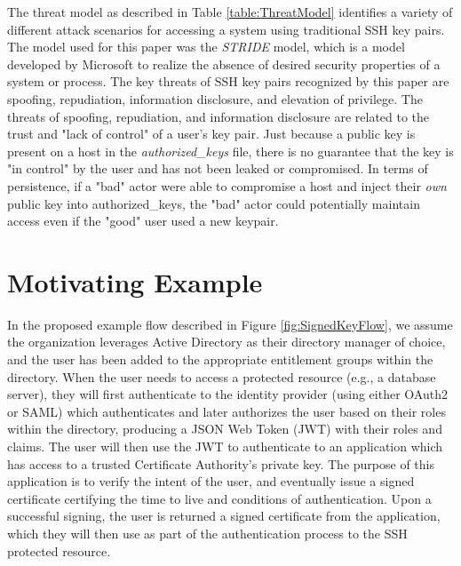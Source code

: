 \documentclass[conference]{IEEEtran}
\begin{document}
The threat model as described in Table \ref{table:ThreatModel} identifies a variety of different attack scenarios for accessing a system using traditional SSH key pairs. The model used for this paper was the \textit{STRIDE} model, which is a model developed by Microsoft to realize the absence of desired security properties of a system or process. The key threats of SSH key pairs recognized by this paper are spoofing, repudiation, information disclosure, and elevation of privilege. The threats of spoofing, repudiation, and information disclosure are related to the trust and "lack of control" of a user's key pair. Just because a public key is present on a host in the \textit{authorized{\_}keys} file, there is no guarantee that the key is "in control" by the user and has not been leaked or compromised. In terms of persistence, if a "bad" actor were able to compromise a host and inject their \textit{own} public key into {authorized{\_}keys}, the "bad" actor could potentially maintain access even if the "good" user used a new keypair.

\section{Motivating Example}

In the proposed example flow described in Figure \ref{fig:SignedKeyFlow}, we assume the organization leverages Active Directory as their directory manager of choice, and the user has been added to the appropriate entitlement groups within the directory. When the user needs to access a protected resource (e.g., a database server), they will first authenticate to the identity provider (using either OAuth2 or SAML) which authenticates and later authorizes the user based on their roles within the directory, producing a JSON Web Token (JWT) with their roles and claims. The user will then use the JWT to authenticate to an application which has access to a trusted Certificate Authority's private key. The purpose of this application is to verify the intent of the user, and eventually issue a signed certificate certifying the time to live and conditions of authentication. Upon a successful signing, the user is returned a signed certificate from the application, which they will then use as part of the authentication process to the SSH protected resource.
\end{document}
